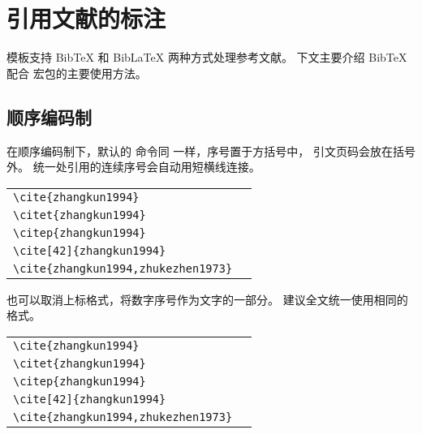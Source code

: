 
\chapter{引用文献的标注}

模板支持 BibTeX 和 BibLaTeX 两种方式处理参考文献。
下文主要介绍 BibTeX 配合  宏包的主要使用方法。


\section{顺序编码制}

在顺序编码制下，默认的  命令同  一样，序号置于方括号中，
引文页码会放在括号外。
统一处引用的连续序号会自动用短横线连接。

\begin{tabular}{l@{\quad$\Rightarrow$\quad}l}
  \verb|\cite{zhangkun1994}|               & \cite{zhangkun1994}               \\
  \verb|\citet{zhangkun1994}|              & \citet{zhangkun1994}              \\
  \verb|\citep{zhangkun1994}|              & \citep{zhangkun1994}              \\
  \verb|\cite[42]{zhangkun1994}|           & \cite[42]{zhangkun1994}           \\
  \verb|\cite{zhangkun1994,zhukezhen1973}| & \cite{zhangkun1994,zhukezhen1973} \\
\end{tabular}


也可以取消上标格式，将数字序号作为文字的一部分。
建议全文统一使用相同的格式。

\begin{tabular}{l@{\quad$\Rightarrow$\quad}l}
  \verb|\cite{zhangkun1994}|               & \cite{zhangkun1994}               \\
  \verb|\citet{zhangkun1994}|              & \citet{zhangkun1994}              \\
  \verb|\citep{zhangkun1994}|              & \citep{zhangkun1994}              \\
  \verb|\cite[42]{zhangkun1994}|           & \cite[42]{zhangkun1994}           \\
  \verb|\cite{zhangkun1994,zhukezhen1973}| & \cite{zhangkun1994,zhukezhen1973} \\
\end{tabular}



